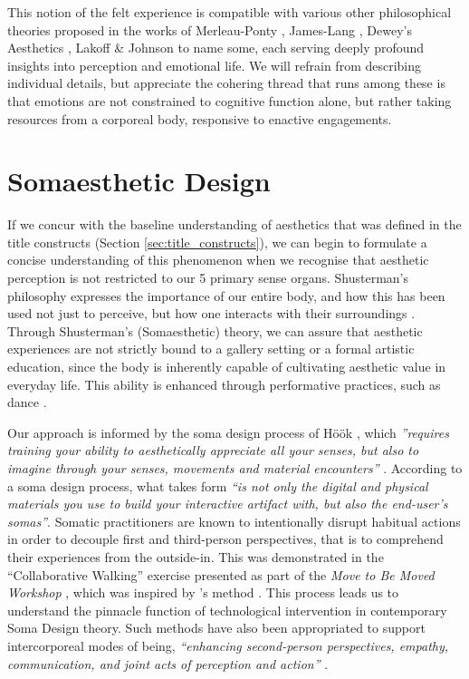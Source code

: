 This notion of the felt experience is compatible with various other philosophical theories proposed in the works of Merleau-Ponty \cite{merleau-ponty_phenomenology_2012}, James-Lang \cite{cannon_james-lange_1927}, Dewey's Aesthetics \cite{dewey_aesthetic_1950}, Lakoff \& Johnson \cite{lakoff_philosophy_1999} to name some, each serving deeply profound insights into perception and emotional life. We will refrain from describing individual details, but appreciate the cohering thread that runs among these is that emotions are not constrained to cognitive function alone, but rather taking resources from a corporeal body, responsive to enactive engagements.

\section{Somaesthetic Design}

If we concur with the baseline understanding of aesthetics that was defined in the title constructs (Section \ref{sec:title_constructs}), we can begin to formulate a concise understanding of this phenomenon when we recognise that aesthetic perception is not restricted to our 5 primary sense organs. Shusterman's philosophy expresses the importance of our entire body, and how this has been used not just to perceive, but how one interacts with their surroundings \cite{shusterman_body_2008}. Through Shusterman’s (Somaesthetic) theory, we can assure that aesthetic experiences are not strictly bound to a gallery setting or a formal artistic education, since the body is inherently capable of cultivating aesthetic value in everyday life. This ability is enhanced through performative practices, such as dance \cite{eric_c_mullis_performative_2006,shusterman_body_2012}.

Our approach is informed by the soma design process of Höök \cite{hook_designing_2018}, which \textit{''requires training your ability to aesthetically appreciate all your senses, but also to imagine through your senses, movements and material encounters''} \cite{hook_soma_2019}. According to a soma design process, what takes form \textit{``is not only the digital and physical materials you use to build your interactive artifact with, but also the end-user's somas''}. Somatic practitioners are known to intentionally disrupt habitual actions in order to decouple first and third-person perspectives, that is to comprehend their experiences from the outside-in. This was demonstrated in the ``Collaborative Walking'' exercise presented as part of the \textit{Move to Be Moved Workshop} \cite{hook_embracing_2018}, which was inspired by \citeauthor{loke_moving_2013}'s method \cite{loke_moving_2013}. This process leads us to understand the pinnacle function of technological intervention in contemporary Soma Design theory. Such methods have also been appropriated to support intercorporeal modes of being, \textit{``enhancing second-person perspectives, empathy, communication, and joint acts of perception and action''} \cite{turmo_vidal_designing_2021}.

